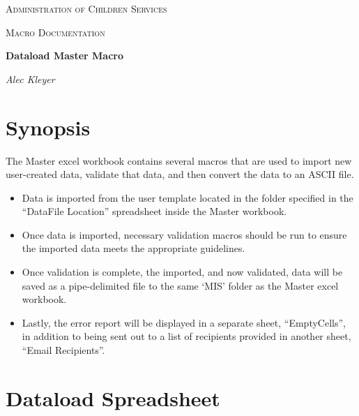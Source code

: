 \documentclass[12pt,a4paper]{report}
\begin{document}
\begin{titlepage}
	\centering
	{\scshape\LARGE Administration of Children Services \par}
	\vspace{1cm}
	{\scshape\Large Macro Documentation\par}
	\vspace{1.5cm}
	{\huge\bfseries Dataload Master Macro\par}
	\vspace{2cm}
	{\Large\itshape Alec Kleyer\par}

	\vfill

\end{titlepage}

\tableofcontents
\chapter{Synopsis}
The Master excel workbook contains several macros that are used to import new user-created data, validate that data, and then convert the data to an ASCII file. 
    \begin{itemize}
        \item Data is imported from the user template located in the folder specified in the ``DataFile Location'' spreadsheet inside the Master workbook. 
        \item Once data is imported, necessary validation macros should be run to ensure the imported data meets the appropriate guidelines. 
        \item Once validation is complete, the imported, and now validated, data will be saved as a pipe-delimited file to the same `MIS' folder as the Master excel workbook. 
        \item Lastly, the error report will be displayed in a separate sheet, ``EmptyCells'', in addition to being sent out to a list of recipients provided in another sheet, ``Email Recipients''.
    \end{itemize}
\chapter{Dataload Spreadsheet}
\end{document}
